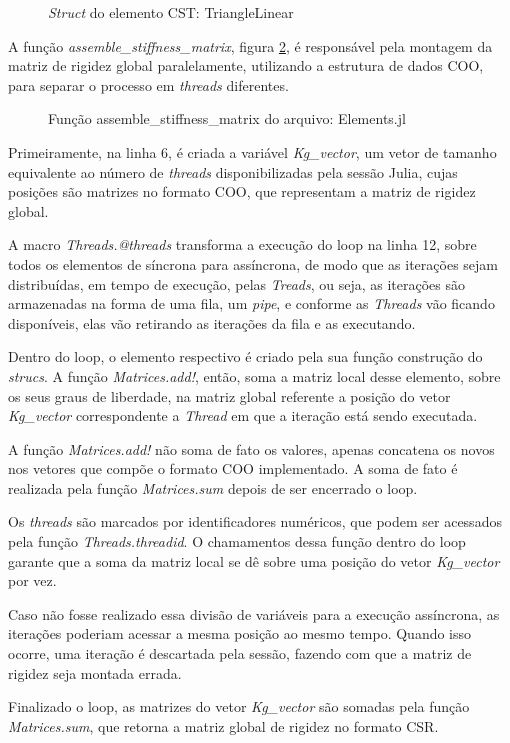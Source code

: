 \begin{figure}[hbtp]
    \caption{\emph{Struct} do elemento CST: TriangleLinear}
    
    \label{fig:TriangleLinear}
\end{figure}

A função \emph{assemble\_stiffness\_matrix}, figura \ref{fig:asm}, é responsável pela montagem da matriz de rigidez global paralelamente, utilizando a estrutura de dados COO, para separar o processo em \emph{threads} diferentes.    

\begin{figure}[hbtp!]
    \caption{Função assemble\_stiffness\_matrix do arquivo: Elements.jl}
    
    \label{fig:asm}
\end{figure}


Primeiramente, na linha 6, é criada a variável \emph{Kg\_vector}, um vetor de tamanho equivalente ao número de \emph{threads} disponibilizadas pela sessão Julia, cujas posições são matrizes no formato COO, que representam a matriz de rigidez global.

A macro \emph{Threads.@threads} transforma a execução do loop na linha 12, sobre todos os elementos de síncrona para assíncrona, de modo que as iterações sejam distribuídas, em tempo de execução, pelas \emph{Treads}, ou seja, as iterações são armazenadas na forma de uma fila, um \emph{pipe}, e conforme as \emph{Threads} vão ficando disponíveis, elas vão retirando as iterações da fila e as executando.

Dentro do loop, o elemento respectivo é criado pela sua função construção do \emph{strucs}. A função \emph{Matrices.add!}, então, soma a matriz local desse elemento, sobre os seus graus de liberdade, na matriz global referente a posição do vetor \emph{Kg\_vector} correspondente a \emph{Thread} em que a iteração está sendo executada.

A função \emph{Matrices.add!} não soma de fato os valores, apenas concatena os novos nos vetores que compõe o formato COO implementado. A soma de fato é realizada pela função \emph{Matrices.sum} depois de ser encerrado o loop.

Os \emph{threads} são marcados por identificadores numéricos, que podem ser acessados pela função \emph{Threads.threadid}. O chamamentos dessa função dentro do loop garante que a soma da matriz local se dê sobre uma posição do vetor \emph{Kg\_vector} por vez.

Caso não fosse realizado essa divisão de variáveis para a execução assíncrona, as iterações poderiam acessar a mesma posição ao mesmo tempo. Quando isso ocorre, uma iteração é descartada pela sessão, fazendo com que a matriz de rigidez seja montada errada.

Finalizado o loop, as matrizes do vetor \emph{Kg\_vector} são somadas pela função \emph{Matrices.sum}, que retorna a matriz global de rigidez no formato CSR.




